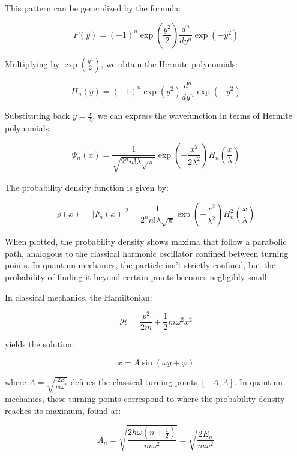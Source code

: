 This pattern can be generalized by the formula:

\begin{equation}
F(y) = (-1)^n\exp\left(\frac{y^2}{2}\right)\frac{d^n}{dy^n}\exp(-y^2)
\end{equation}

Multiplying by $\exp\left(\frac{y^2}{2}\right)$, we obtain the Hermite polynomials:

\begin{equation}
H_n(y) = (-1)^n\exp(y^2)\frac{d^n}{dy^n}\exp(-y^2)
\end{equation}

Substituting back $y=\frac{x}{\lambda}$, we can express the wavefunction in terms of Hermite polynomials:

\begin{equation}
\Psi_n(x) = \frac{1}{\sqrt{2^n n!\lambda\sqrt{\pi}}}\exp\left(-\frac{x^2}{2\lambda^2}\right)H_n\left(\frac{x}{\lambda}\right)
\end{equation}

The probability density function is given by:

\begin{equation}
\rho(x) = |\Psi_n(x)|^2 = \frac{1}{2^n n!\lambda\sqrt{\pi}}\exp\left(-\frac{x^2}{\lambda^2}\right)H_n^2\left(\frac{x}{\lambda}\right)
\end{equation}

When plotted, the probability density shows maxima that follow a parabolic path, analogous to the classical harmonic oscillator confined between turning points. In quantum mechanics, the particle isn't strictly confined, but the probability of finding it beyond certain points becomes negligibly small.

In classical mechanics, the Hamiltonian:

\begin{equation}
\mathcal{H} = \frac{p^2}{2m} + \frac{1}{2}m\omega^2 x^2
\end{equation}

yields the solution:

\begin{equation}
x = A\sin(\omega y + \varphi)
\end{equation}

where $A = \sqrt{\frac{2E}{m\omega^2}}$ defines the classical turning points $[-A,A]$. In quantum mechanics, these turning points correspond to where the probability density reaches its maximum, found at:

\begin{equation}
A_n = \sqrt{\frac{2\hbar\omega(n+\frac{1}{2})}{m\omega^2}} = \sqrt{\frac{2E_n}{m\omega^2}}
\end{equation}

